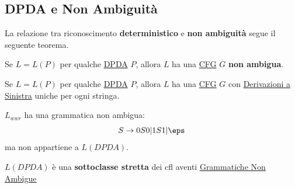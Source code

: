 \subsection{DPDA e Non Ambiguità}\label{sub:ll_dpda_e_non_ambiguit} %
La relazione tra riconoscimento \textbf{deterministico} e \textbf{non ambiguità} segue il seguente teorema.
\begin{theorem}{}{}
    Se $L=L(P)$ per qualche \hyperref[def:dpda]{DPDA} $P$, allora $L$ ha una \hyperref[def:cfg]{CFG} $G$ \textbf{non ambigua}.
\end{theorem}
\begin{outerproof}{}{}
    Se $L = L(P)$ per qualche \hyperref[def:dpda]{DPDA} $P$, allora $L$ ha una \hyperref[def:cfg]{CFG} $G$ con \hyperref[rem:gram-derivazione]{Derivazioni a Sinistra} uniche per ogni stringa.
    \begin{warning}
    \end{warning}
    \begin{example}{}{}
        $L_{wwr}$ ha una grammatica non ambigua:
        \[
            S\to0S0|1S1|\eps
        \]
        ma non appartiene a $L(DPDA)$.
        \begin{note}[Quindi]
            $L(DPDA)$ è una \textbf{sottoclasse stretta} dei \ac{cfl} aventi \hyperref[sub:ll_ambiguit_inerente]{Grammatiche Non Ambigue}
        \end{note}
    \end{example}
\end{outerproof}
